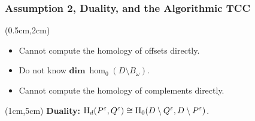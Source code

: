 \begin{frame}
  \frametitle{{\small Assumption 2, Duality, and the Algorithmic TCC}}

  \begin{textblock*}{12cm}(0.5cm,2cm)
    \begin{small}
      \begin{itemize}
        \item Cannot compute the homology of offsets directly.
        \item Do not know $\mathbf{dim}~\hom_0(D\setminus B_\omega)$.
        \item Cannot compute the homology of complements directly.
      \end{itemize}
    \end{small}
  \end{textblock*}

  \begin{textblock*}{10cm}(1cm,5cm)
    \textbf{Duality:} $\mathrm{H}_d(P^\varepsilon,Q^\varepsilon)\cong\mathrm{H}_0(D\setminus Q^\varepsilon, D\setminus P^\varepsilon)$.\vspace{2ex}

  \end{textblock*}

\end{frame}


